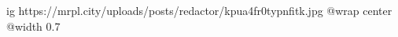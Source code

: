  
 
 
 
 

\ifcmt
  ig https://mrpl.city/uploads/posts/redactor/kpua4fr0typnfitk.jpg
  @wrap center
  @width 0.7
\fi

